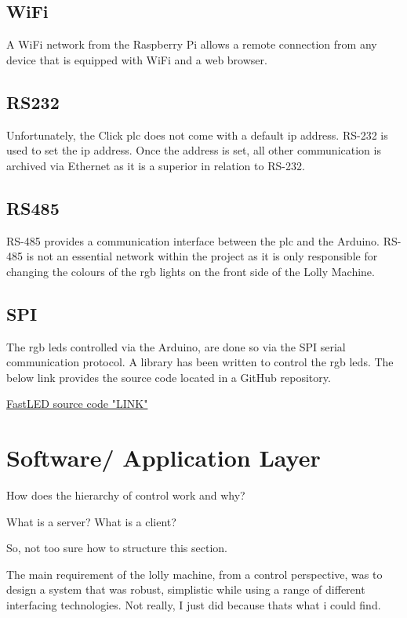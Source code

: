     \subsection{WiFi}
    A WiFi network from the Raspberry Pi allows a remote connection from any device that is equipped with WiFi and a web browser. 
    
    \subsection{RS232}
    Unfortunately, the Click \acrshort{plc} does not come with a default \acrshort{ip} address. RS-232 is used to set the \acrshort{ip} address. Once the address is set, all other communication is archived via Ethernet as it is a superior in relation to RS-232.
    
    \subsection{RS485}
    RS-485 provides a communication interface between the \acrshort{plc} and the Arduino. RS-485 is not an essential network within the project as it is only responsible for changing the colours of the \acrshort{rgb} lights on the front side of the Lolly Machine.
    
    \subsection{SPI}
    The \acrshort{rgb} \acrshort{led}s controlled via the Arduino, are done so via the SPI serial communication protocol. A library has been written to control the \acrshort{rgb} \acrshort{led}s. The below link provides the source code located in a GitHub repository.
    
        \href{https://github.com/FastLED/FastLED}{FastLED source code "LINK"} \cite{FastLED} 
        
    
    
    
    \section{Software/ Application Layer}
        How does the hierarchy of control work and why?
    
        What is a server? What is a client?
    
        So, not too sure how to structure this section.
    
        The main requirement of the lolly machine, from a control perspective, was to design a system that was robust, simplistic while using a range of different interfacing technologies. Not really, I just did because thats what i could find. 
    
